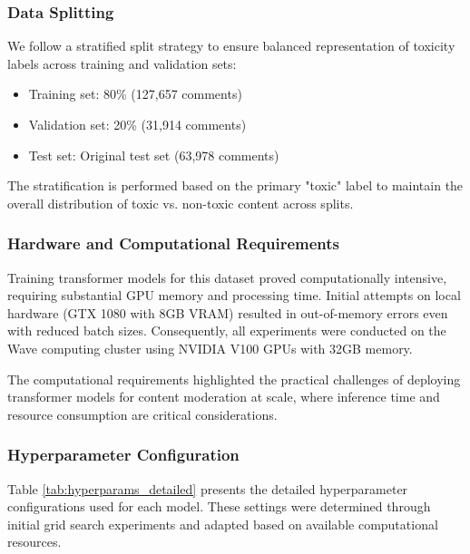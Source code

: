\documentclass[11pt]{article}
\begin{document}
\subsubsection{Data Splitting}

We follow a stratified split strategy to ensure balanced representation of toxicity labels across training and validation sets:
\begin{itemize}
    \item Training set: 80\% (127,657 comments)
    \item Validation set: 20\% (31,914 comments)
    \item Test set: Original test set (63,978 comments)
\end{itemize}

The stratification is performed based on the primary "toxic" label to maintain the overall distribution of toxic vs. non-toxic content across splits.

\subsubsection{Hardware and Computational Requirements}

Training transformer models for this dataset proved computationally intensive, requiring substantial GPU memory and processing time. Initial attempts on local hardware (GTX 1080 with 8GB VRAM) resulted in out-of-memory errors even with reduced batch sizes. Consequently, all experiments were conducted on the Wave computing cluster using NVIDIA V100 GPUs with 32GB memory.

The computational requirements highlighted the practical challenges of deploying transformer models for content moderation at scale, where inference time and resource consumption are critical considerations.

\subsubsection{Hyperparameter Configuration}

Table \ref{tab:hyperparams_detailed} presents the detailed hyperparameter configurations used for each model. These settings were determined through initial grid search experiments and adapted based on available computational resources.
\end{document}
